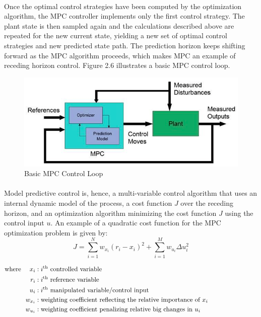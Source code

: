 \paragraph{}
Once the optimal control strategies have been computed by the optimization algorithm, the MPC controller implements only the first control strategy. The plant state is then sampled again and the calculations described above are repeated for the new current state, yielding a new set of optimal control strategies and new predicted state path. The prediction horizon keeps shifting forward as the MPC algorithm proceeds, which makes MPC an example of receding horizon control. Figure 2.6 illustrates a basic MPC control loop. 
\begin{figure}[H]\label{fig2.5}
\centering \includegraphics[scale = 0.6]{Images/mpc_control_loop.png}
\caption{Basic MPC Control Loop}
\end{figure}

\paragraph{}
Model predictive control is, hence, a multi-variable control algorithm that uses an internal dynamic model of the process, a cost function $J$ over the receding horizon, and an optimization algorithm minimizing the cost function $J$ using the control input $u$. An example of a quadratic cost function for the MPC optimization problem is given by:
$$J=\sum_{i=1}^Nw_{x_i}(r_i-x_i)^2+\sum_{i=1}^Mw_{u_i}\Delta u_i^2$$
\vspace{-12.5mm}

\begin{align*}
    \text{where }\text{ }\text{ }\text{ }x_i&: i^{\text{th}}\text{ controlled variable}\hspace{0.7\textwidth}\\
    r_i&: i^{\text{th}}\text{ reference variable}\hfill\\
    u_i&: i^{\text{th}}\text{ manipulated variable/control input}\hfill\\
    w_{x_i}&:\text{weighting coefficient reflecting the relative importance of }x_i\hfill\\
    w_{u_i}&:\text{weighting coefficient penalizing relative big changes in } u_i\hfill
\end{align*}

